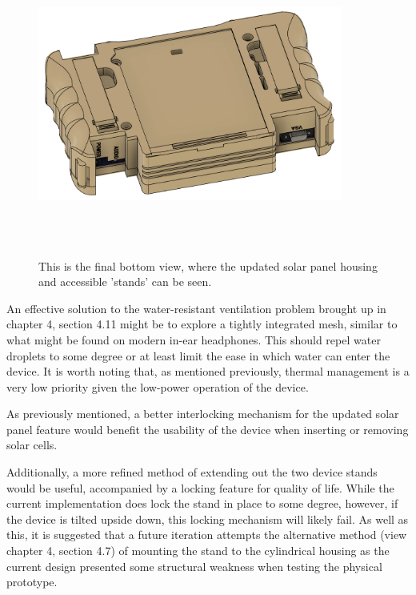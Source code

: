 \begin{figure} [h]
    \centering
    \includegraphics[width=10cm,height=10cm,keepaspectratio]{Figures/final_back_cad.png}
    \caption{This is the final bottom view, where the updated solar panel housing and accessible 'stands' can be seen.}
    \label{fig:FinalBOTTOM}
\end{figure}

An effective solution to the water-resistant ventilation problem brought up in chapter 4, section 4.11 might be to explore a tightly integrated mesh, similar to what might be found on modern in-ear headphones.
This should repel water droplets to some degree or at least limit the ease in which water can enter the device.
It is worth noting that, as mentioned previously, thermal management is a very low priority given the low-power operation of the device.

As previously mentioned, a better interlocking mechanism for the updated solar panel feature would benefit the usability of the device when inserting or removing solar cells.

Additionally, a more refined method of extending out the two device stands would be useful, accompanied by a locking feature for quality of life.
While the current implementation does lock the stand in place to some degree, however, if the device is tilted upside down, this locking mechanism will likely fail.
As well as this, it is suggested that a future iteration attempts the alternative method (view chapter 4, section 4.7) of mounting the stand to the cylindrical housing as the current design presented some structural weakness when testing the physical prototype.

